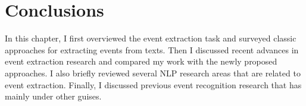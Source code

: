 \section{Conclusions}

In this chapter, I first overviewed the event extraction task and surveyed 
classic approaches for extracting events from texts. 
Then I discussed recent advances in event extraction research and 
compared my work with the newly proposed approaches. 
I also briefly reviewed several NLP research areas that are related to 
event extraction. 
Finally, I discussed previous event recognition research that has 
mainly under other guises. 